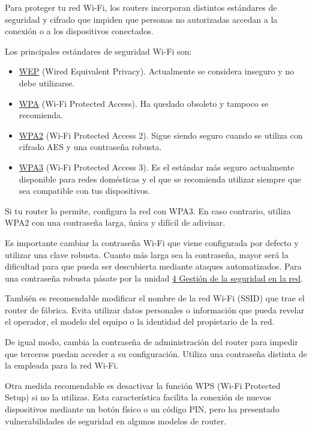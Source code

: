 \documentclass[
  spanish,
  a4paper,
  openany]{book}
\providecommand{\tightlist}{%
  \setlength{\itemsep}{0pt}\setlength{\parskip}{0pt}}
\begin{document}
Para proteger tu red Wi-Fi, los routers incorporan distintos estándares de seguridad y cifrado que impiden que personas no autorizadas accedan a la conexión o a los dispositivos conectados.

Los principales estándares de seguridad Wi-Fi son:

\begin{itemize}
\tightlist
\item
  \href{https://es.wikipedia.org/wiki/Wired_Equivalent_Privacy}{WEP} (Wired Equivalent Privacy). Actualmente se considera inseguro y no debe utilizarse.
\item
  \href{https://es.wikipedia.org/wiki/Wi-Fi_Protected_Access}{WPA} (Wi-Fi Protected Access). Ha quedado obsoleto y tampoco se recomienda.
\item
  \href{https://es.wikipedia.org/wiki/WPA2}{WPA2} (Wi-Fi Protected Access 2). Sigue siendo seguro cuando se utiliza con cifrado AES y una contraseña robusta.
\item
  \href{https://es.wikipedia.org/wiki/WPA3}{WPA3} (Wi-Fi Protected Access 3). Es el estándar más seguro actualmente disponible para redes domésticas y el que se recomienda utilizar siempre que sea compatible con tus dispositivos.
\end{itemize}

Si tu router lo permite, configura la red con WPA3. En caso contrario, utiliza WPA2 con una contraseña larga, única y difícil de adivinar.

Es importante cambiar la contraseña Wi-Fi que viene configurada por defecto y utilizar una clave robusta. Cuanto más larga sea la contraseña, mayor será la dificultad para que pueda ser descubierta mediante ataques automatizados. Para una contraseña robusta pásate por la unidad \hyperref[gestiuxf3n-de-la-seguridad-en-la-red]{4 Gestión de la seguridad en la red}.

También es recomendable modificar el nombre de la red Wi-Fi (SSID) que trae el router de fábrica. Evita utilizar datos personales o información que pueda revelar el operador, el modelo del equipo o la identidad del propietario de la red.

De igual modo, cambia la contraseña de administración del router para impedir que terceros puedan acceder a su configuración. Utiliza una contraseña distinta de la empleada para la red Wi-Fi.

Otra medida recomendable es desactivar la función WPS (Wi-Fi Protected Setup) si no la utilizas. Esta característica facilita la conexión de nuevos dispositivos mediante un botón físico o un código PIN, pero ha presentado vulnerabilidades de seguridad en algunos modelos de router.
\end{document}
